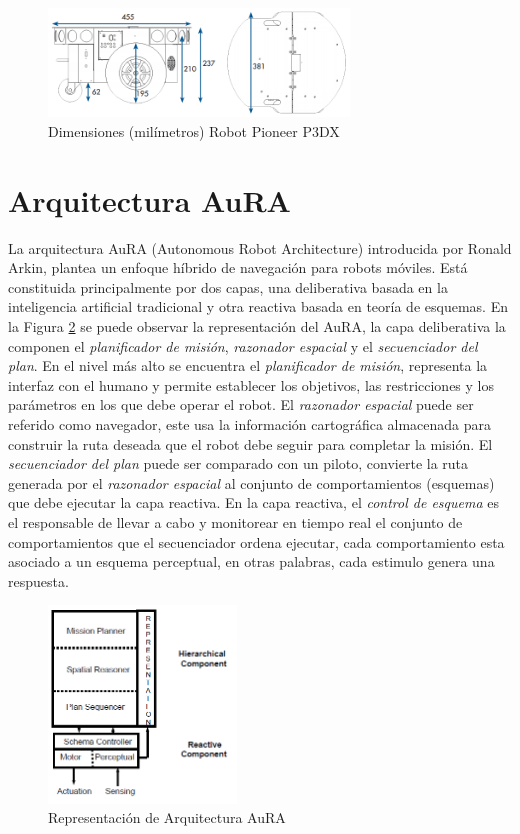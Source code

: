 \documentclass[11pt,twoside,A5]{article}
\newcommand{\reffigure}[1]{Figura \ref{#1}}
\begin{document}
\begin{figure}[here]
	\centering
	\includegraphics[width=8cm]{pioneer-dimensiones.png} 
	\caption{Dimensiones (milímetros) Robot Pioneer P3DX}
	\label{fig:pioneer-dimensiones}
\end{figure} 

\section*{Arquitectura AuRA}

La arquitectura AuRA \cite{arkin1997} (Autonomous Robot Architecture) introducida por Ronald Arkin, plantea un enfoque híbrido
de navegación para robots móviles. Está constituida principalmente por dos capas, una deliberativa basada en la inteligencia artificial
tradicional y otra reactiva basada en teoría de esquemas. En la \reffigure{fig:aura} se puede observar la representación del AuRA, 
la capa deliberativa la componen el \textit{planificador de misión}, \textit{razonador espacial} y el \textit{secuenciador del plan}. En el nivel más alto se encuentra el \textit{planificador de misión}, representa la interfaz con el humano y permite establecer los objetivos, 
las restricciones y los parámetros en los que debe operar el robot. El \textit{razonador espacial} puede ser referido como navegador, este usa la información cartográfica
almacenada para construir la ruta deseada que el robot debe seguir para completar la misión. El \textit{secuenciador del plan}
puede ser comparado con un piloto, convierte la ruta generada por el \textit{razonador espacial} al conjunto de comportamientos (esquemas) que debe ejecutar la capa reactiva. En la capa reactiva, el \textit{control de esquema} es el responsable de llevar a cabo y monitorear en tiempo real el conjunto de comportamientos que el secuenciador ordena ejecutar, cada comportamiento esta asociado a un esquema perceptual, en otras palabras, cada estimulo genera una respuesta. 

\begin{figure}[here]
\begin{center}
\includegraphics[width=5cm]{aura.png} 
\caption{Representación de Arquitectura AuRA}
\label{fig:aura}
\end{center}
\end{figure} 
\end{document}
